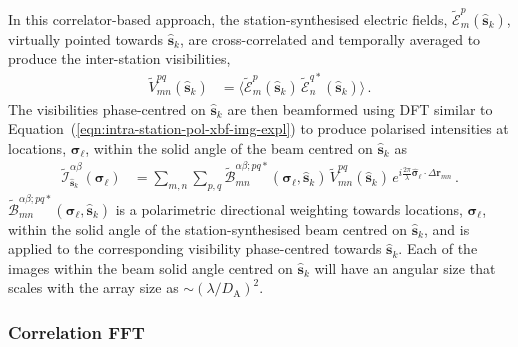 \documentclass[
  journal=pasa,
  manuscript=article-type,
  year=2020,
  volume=37,
]{cup-journal}
\begin{document}
In this correlator-based approach, the station-synthesised electric fields,
$\widetilde{\mathcal{E}}_m^p(\hat{\boldsymbol{s}}_k)$, virtually pointed towards $\hat{\boldsymbol{s}}_k$, are cross-correlated and temporally averaged to produce the inter-station visibilities, 
\begin{align}
    \widetilde{V}_{mn}^{pq}(\hat{\boldsymbol{s}}_k) &= \bigl\langle \widetilde{\mathcal{E}}_m^p(\hat{\boldsymbol{s}}_k) \, \widetilde{\mathcal{E}}_n^{q*}(\hat{\boldsymbol{s}}_k)\bigr\rangle \, . \label{eqn:inter-station-pol-visibilities}
\end{align}
The visibilities phase-centred on $\hat{\boldsymbol{s}}_k$ are then beamformed using DFT similar to Equation~(\ref{eqn:intra-station-pol-xbf-img-expl}) to produce polarised intensities at locations, $\boldsymbol{\sigma}_\ell$, within the solid angle of the beam centred on $\hat{\boldsymbol{s}}_k$ as 
\begin{align}
    \widetilde{\mathcal{I}}^{\alpha\beta}_{\hat{\boldsymbol{s}}_k}(\boldsymbol{\sigma}_\ell)
    &= \sum_{m,n} \sum_{p,q} \widetilde{\mathcal{B}}_{mn}^{\alpha\beta;pq*}(\boldsymbol{\sigma}_\ell, \hat{\boldsymbol{s}}_k) \, \widetilde{V}_{mn}^{pq}(\hat{\boldsymbol{s}}_k) \,  e^{i\frac{2\pi}{\lambda} \hat{\boldsymbol{\sigma}}_\ell\cdot\Delta\boldsymbol{r}_{m n}} \, . \label{eqn:inter-station-pol-xbf-img-expl} 
\end{align}
$\widetilde{\mathcal{B}}_{mn}^{\alpha\beta;pq*}(\boldsymbol{\sigma}_\ell,\hat{\boldsymbol{s}}_k)$ is a polarimetric directional weighting towards locations, $\boldsymbol{\sigma}_\ell$, within the solid angle of the station-synthesised beam centred on $\hat{\boldsymbol{s}}_k$, and is applied to the corresponding visibility phase-centred towards $\hat{\boldsymbol{s}}_k$. Each of the images within the beam solid angle centred on $\hat{\boldsymbol{s}}_k$ will have an angular size that scales with the array size as $\sim (\lambda/D_\textrm{A})^2$. 

\subsubsection{Correlation FFT}
\end{document}
